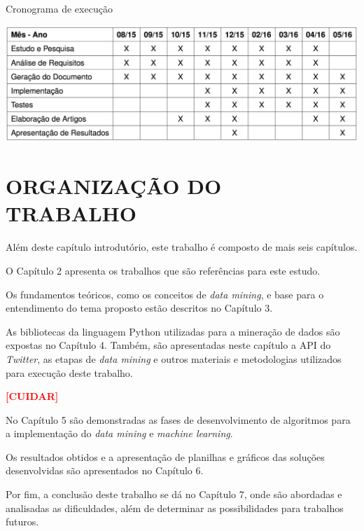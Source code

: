 \begin{table}[h!]
	\centering
	\caption{Cronograma de execução}
	\includegraphics[width=1\textwidth]{Cap1/imagens/tabela}
	\label{cronograma}
\end{table}


\section{ORGANIZAÇÃO DO TRABALHO}\label{sec:organizacao-trabalho}

Além deste capítulo introdutório, este trabalho é composto de mais seis capítulos.

O Capítulo 2 apresenta os trabalhos que são referências para este estudo.

Os fundamentos teóricos, como os conceitos de \textit{data mining}, e base para o entendimento do tema proposto estão descritos no Capítulo 3.

As bibliotecas da linguagem Python utilizadas para a mineração de dados são expostas no Capítulo 4. Também, são apresentadas neste capítulo a API do \textit{Twitter}, as etapas de \textit{data mining} e outros materiais e metodologias utilizados para execução deste trabalho.

\textbf{\textcolor{red}{[CUIDAR]}}

No Capítulo 5 são demonstradas as fases de desenvolvimento de algoritmos para a implementação do \textit{data mining} e \textit{machine learning}.

Os resultados obtidos e a apresentação de planilhas e gráficos das soluções desenvolvidas são apresentados no Capítulo 6.

Por fim, a conclusão deste trabalho se dá no Capítulo 7, onde são abordadas e analisadas as dificuldades, além de determinar as possibilidades para trabalhos futuros.
